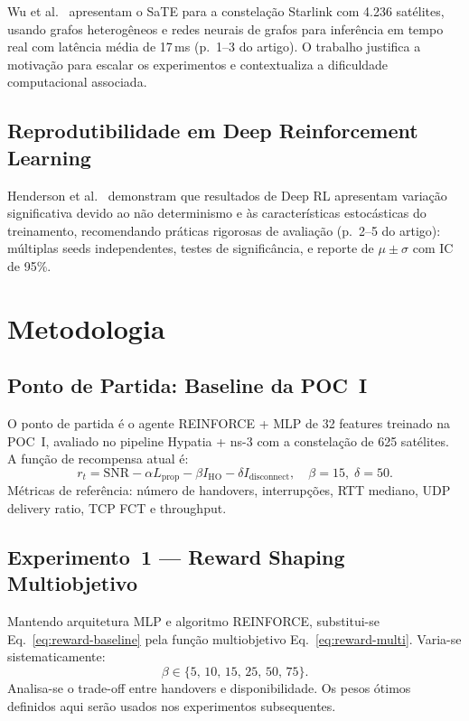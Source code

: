 \documentclass[12pt,a4paper]{article}
\begin{document}
Wu et al.~\cite{wu2025} apresentam o SaTE para a constelação Starlink com 4.236
satélites, usando grafos heterogêneos e redes neurais de grafos para inferência
em tempo real com latência média de 17\,ms (p.~1--3 do artigo). O trabalho
justifica a motivação para escalar os experimentos e contextualiza a dificuldade
computacional associada.

\subsection{Reprodutibilidade em Deep Reinforcement Learning}

Henderson et al.~\cite{henderson2018} demonstram que resultados de Deep RL
apresentam variação significativa devido ao não determinismo e às características
estocásticas do treinamento, recomendando práticas rigorosas de avaliação (p.~2--5
do artigo): múltiplas seeds independentes, testes de significância, e reporte de
$\mu \pm \sigma$ com IC de 95\%.

\section{Metodologia}

\subsection{Ponto de Partida: Baseline da POC~I}

O ponto de partida é o agente REINFORCE + MLP de 32 features treinado na POC~I,
avaliado no pipeline Hypatia + ns-3 com a constelação de 625 satélites. A função
de recompensa atual é:
\begin{equation}
  r_t = \text{SNR} - \alpha L_{\text{prop}} - \beta I_{\text{HO}} - \delta I_{\text{disconnect}},
  \quad \beta = 15,\; \delta = 50.
  \label{eq:reward-baseline}
\end{equation}
Métricas de referência: número de handovers, interrupções, RTT mediano, UDP
delivery ratio, TCP FCT e throughput.

\subsection{Experimento~1 --- Reward Shaping Multiobjetivo}

Mantendo arquitetura MLP e algoritmo REINFORCE, substitui-se
Eq.~\eqref{eq:reward-baseline} pela função multiobjetivo Eq.~\eqref{eq:reward-multi}.
Varia-se sistematicamente:
\[
  \beta \in \{5,\, 10,\, 15,\, 25,\, 50,\, 75\}.
\]
Analisa-se o trade-off entre handovers e disponibilidade. Os pesos ótimos
definidos aqui serão usados nos experimentos subsequentes.
\end{document}
